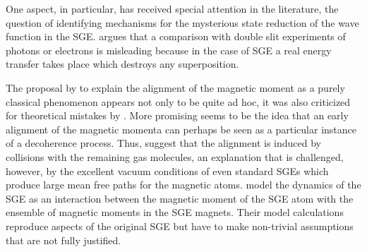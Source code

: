 \documentclass[12pt]{article}
\begin{document}
One aspect, in particular, has received special attention in the literature, the question of identifying mechanisms for the mysterious state reduction of the wave function in the SGE. \cite{DevereuxM2015Reduction} argues that a comparison with double slit experiments of photons or electrons is misleading because in the case of SGE a real energy transfer takes place which destroys any superposition.

The proposal by \cite{FrancaH2009Phenomenon} to explain the alignment of the magnetic moment as a purely classical phenomenon appears not only to be quite ad hoc, it was also criticized for theoretical mistakes by \cite{RibeiroJ2010Was}. More promising seems to be the idea that an early alignment of the magnetic momenta can perhaps be seen as a particular instance of a decoherence process. Thus, 
\cite{GomisP2016Effects} suggest that the alignment is induced by collisions with the remaining gas molecules, an explanation that is challenged, however, by the excellent vacuum conditions of even standard SGEs which produce large mean free paths for the magnetic atoms. 
\cite{WennerstroemHEtal2012experiment,WennerstroemHEtal2013measurements,WennerstroemHEtal2014Interpretation} model the dynamics of the SGE as an interaction between the magnetic moment of the SGE atom with the ensemble of magnetic moments in the SGE magnets. Their model calculations reproduce aspects of the original SGE but have to make non-trivial assumptions that are not fully justified.
\end{document}
